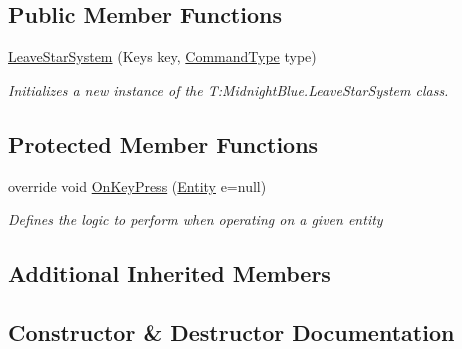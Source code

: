 \subsection*{Public Member Functions}
\begin{DoxyCompactItemize}
\item 
\hyperlink{class_midnight_blue_1_1_leave_star_system_a6793d6a941afd58a9e9030d8aec1fe83}{Leave\+Star\+System} (Keys key, \hyperlink{namespace_midnight_blue_1_1_engine_1_1_i_o_a8bc3f159399ecadd590f7df1b54354b0}{Command\+Type} type)
\begin{DoxyCompactList}\small\item\em Initializes a new instance of the T\+:\+Midnight\+Blue.\+Leave\+Star\+System class. \end{DoxyCompactList}\end{DoxyCompactItemize}
\subsection*{Protected Member Functions}
\begin{DoxyCompactItemize}
\item 
override void \hyperlink{class_midnight_blue_1_1_leave_star_system_ad2e048edbe7a4816d9ed8fc87cf4eb91}{On\+Key\+Press} (\hyperlink{class_midnight_blue_1_1_engine_1_1_entity_component_1_1_entity}{Entity} e=null)
\begin{DoxyCompactList}\small\item\em Defines the logic to perform when operating on a given entity \end{DoxyCompactList}\end{DoxyCompactItemize}
\subsection*{Additional Inherited Members}


\subsection{Constructor \& Destructor Documentation}
\hypertarget{class_midnight_blue_1_1_leave_star_system_a6793d6a941afd58a9e9030d8aec1fe83}{}\label{class_midnight_blue_1_1_leave_star_system_a6793d6a941afd58a9e9030d8aec1fe83} 
